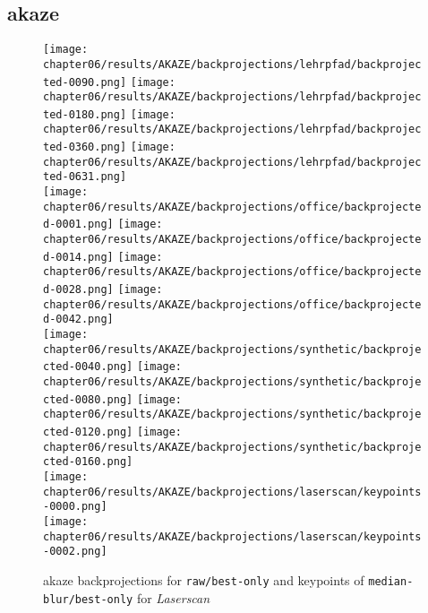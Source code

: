 \subsection{\acrshort{akaze}}\label{sec:backprojection_akaze}
\begin{figure}[H]
    \texttt{[image: chapter06/results/AKAZE/backprojections/lehrpfad/backprojected-0090.png]}%
    \texttt{[image: chapter06/results/AKAZE/backprojections/lehrpfad/backprojected-0180.png]}%
    \texttt{[image: chapter06/results/AKAZE/backprojections/lehrpfad/backprojected-0360.png]}%
    \texttt{[image: chapter06/results/AKAZE/backprojections/lehrpfad/backprojected-0631.png]}\\
    \texttt{[image: chapter06/results/AKAZE/backprojections/office/backprojected-0001.png]}%
    \texttt{[image: chapter06/results/AKAZE/backprojections/office/backprojected-0014.png]}%
    \texttt{[image: chapter06/results/AKAZE/backprojections/office/backprojected-0028.png]}%
    \texttt{[image: chapter06/results/AKAZE/backprojections/office/backprojected-0042.png]}\\
    \texttt{[image: chapter06/results/AKAZE/backprojections/synthetic/backprojected-0040.png]}%
    \texttt{[image: chapter06/results/AKAZE/backprojections/synthetic/backprojected-0080.png]}%
    \texttt{[image: chapter06/results/AKAZE/backprojections/synthetic/backprojected-0120.png]}%
    \texttt{[image: chapter06/results/AKAZE/backprojections/synthetic/backprojected-0160.png]}\\
    \texttt{[image: chapter06/results/AKAZE/backprojections/laserscan/keypoints-0000.png]}\\
    \texttt{[image: chapter06/results/AKAZE/backprojections/laserscan/keypoints-0002.png]}\\
    \caption[\acrshort{akaze} backprojections and keypoints]{\acrshort{akaze} backprojections for \texttt{raw/best-only} and keypoints of \texttt{median-blur/best-only} for \emph{Laserscan}}
\end{figure}
